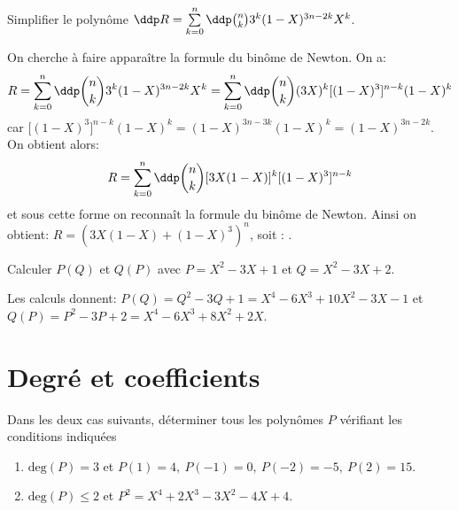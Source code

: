 \documentclass[a4paper, 11pt,reqno]{article}
\begin{document}
\begin{exercice}  \;
	Simplifier le polyn\^ome $\ddp R=\sum\limits_{k=0}^n \ddp \binom{n}{k} 3^k(1-X)^{3n-2k}X^k$.
\end{exercice}
\begin{correction}  \;
	On cherche \`{a} faire appara\^{i}tre la formule du bin\^{o}me de Newton. On a:
	$$R=\sum\limits_{k=0}^n \ddp \binom{n}{k} 3^k(1-X)^{3n-2k}X^k=
		\sum\limits_{k=0}^n \ddp \binom{n}{k} (3X)^k\lbrack (1-X)^3\rbrack^{n-k}(1-X)^k$$
	car $\lbrack (1-X)^3\rbrack^{n-k}(1-X)^k= (1-X)^{3n-3k} (1-X)^k=(1-X)^{3n-2k}$. On obtient alors:
	$$R=\sum\limits_{k=0}^n \ddp \binom{n}{k} \lbrack3X(1-X)\rbrack^k\lbrack (1-X)^3\rbrack^{n-k}$$
	et sous cette forme on reconna\^{i}t la formule du bin\^{o}me de Newton. Ainsi on obtient: $R=\left(  3X(1-X)+(1-X)^3  \right)^n$, soit : .
\end{correction}




\begin{exercice}
	Calculer $P(Q)$ et $Q(P)$ avec $P=X^2-3X+1$ et $Q=X^2-3X+2$.
\end{exercice}
\begin{correction}
	Les calculs donnent: $P(Q)=Q^2-3Q+1=X^4-6X^3+10X^2-3X-1$ et $Q(P)=P^2-3P+2=X^4-6X^3+8X^2+2X$.
\end{correction}

\section{\large{Degr\'e et coefficients}}

\begin{exercice}  \;
	Dans les deux cas suivants, d\'eterminer tous les polyn\^omes $P$ v\'erifiant les conditions indiqu\'ees
	\begin{enumerate}
		\item $\mathrm{deg}(P)=3$ et $P(1)=4,\ P(-1)=0,\ P(-2)=-5,\ P(2)=15$.
		\item $\mathrm{deg}(P)\leq 2$ et $P^2=X^4+2X^3-3X^2-4X+4$.
	\end{enumerate}
\end{exercice}
\end{document}
